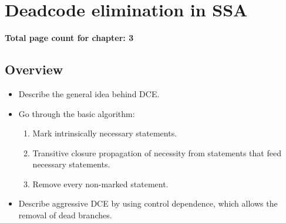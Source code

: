 \applynumberofpages\chapter{Deadcode elimination in SSA }

\textbf{Total page count for chapter: 3}

\section{Overview}

\begin{itemize}
\item	Describe the general idea behind DCE.

\item	Go through the basic algorithm:
	\begin{enumerate}
	\item	Mark intrinsically necessary statements.
	\item	Transitive closure propagation of necessity from
		statements that feed necessary statements.
	\item	Remove every non-marked statement.
	\end{enumerate}

\item	Describe aggressive DCE by using control dependence,
	which allows the removal of dead branches.
\end{itemize}
